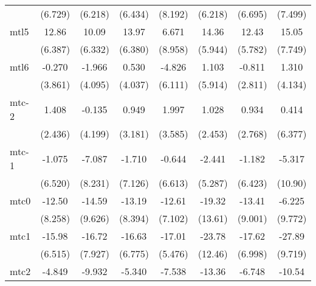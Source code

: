 \documentclass{article}
\begin{document}
{\begin{longtable}{l*{7}{c}}
                &  (6.729)         &  (6.218)         &  (6.434)         &  (8.192)         &  (6.218)         &  (6.695)         &  (7.499)         \\
mtl5            &    12.86         &    10.09         &    13.97         &    6.671         &    14.36         &    12.43         &    15.05         \\
                &  (6.387)         &  (6.332)         &  (6.380)         &  (8.958)         &  (5.944)         &  (5.782)         &  (7.749)         \\
mtl6            &   -0.270         &   -1.966         &    0.530         &   -4.826         &    1.103         &   -0.811         &    1.310         \\
                &  (3.861)         &  (4.095)         &  (4.037)         &  (6.111)         &  (5.914)         &  (2.811)         &  (4.134)         \\
mtc-2           &    1.408         &   -0.135         &    0.949         &    1.997         &    1.028         &    0.934         &    0.414         \\
                &  (2.436)         &  (4.199)         &  (3.181)         &  (3.585)         &  (2.453)         &  (2.768)         &  (6.377)         \\
mtc-1           &   -1.075         &   -7.087         &   -1.710         &   -0.644         &   -2.441         &   -1.182         &   -5.317         \\
                &  (6.520)         &  (8.231)         &  (7.126)         &  (6.613)         &  (5.287)         &  (6.423)         &  (10.90)         \\
mtc0            &   -12.50         &   -14.59         &   -13.19         &   -12.61         &   -19.32         &   -13.41         &   -6.225         \\
                &  (8.258)         &  (9.626)         &  (8.394)         &  (7.102)         &  (13.61)         &  (9.001)         &  (9.772)         \\
mtc1            &   -15.98         &   -16.72         &   -16.63         &   -17.01\sym{*}  &   -23.78         &   -17.62         &   -27.89\sym{*}  \\
                &  (6.515)         &  (7.927)         &  (6.775)         &  (5.476)         &  (12.46)         &  (6.998)         &  (9.719)         \\
mtc2            &   -4.849         &   -9.932         &   -5.340         &   -7.538         &   -13.36         &   -6.748         &   -10.54         \\

\end{longtable}}
\end{document}
